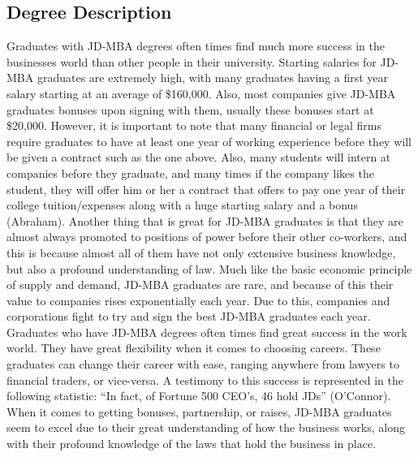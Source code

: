 \begin{multicols}{2}

\section{Degree Description}
	Graduates with JD-MBA degrees often times find much more success in the businesses world than other people in their university. Starting salaries for JD-MBA graduates are extremely high, with many graduates having a first year salary starting at an average of \$160,000. Also, most companies give JD-MBA graduates bonuses upon signing with them, usually these bonuses start at \$20,000. However, it is important to note that many financial or legal firms require graduates to have at least one year of working experience before they will be given a contract such as the one above. Also, many students will intern at companies before they graduate, and many times if the company likes the student, they will offer him or her a contract that offers to pay one year of their college tuition/expenses along with a huge starting salary and a bonus (Abraham). Another thing that is great for JD-MBA graduates is that they are almost always promoted to positions of power before their other co-workers, and this is because almost all of them have not only extensive business knowledge, but also a profound understanding of law. Much like the basic economic principle of supply and demand, JD-MBA graduates are rare, and because of this their value to companies rises exponentially each year.  Due to this, companies and corporations fight to try and sign the best JD-MBA graduates each year. Graduates who have JD-MBA degrees often times find great success in the work world. They have great flexibility when it comes to choosing careers. These graduates can change their career with ease, ranging anywhere from lawyers to financial traders, or vice-versa. A testimony to this success is represented in the following statistic: “In fact,  of Fortune 500 CEO’s, 46 hold JDs” (O’Connor). When it comes to getting bonuses, partnership, or raises, JD-MBA graduates seem to excel due to their great understanding of how the business works, along with their profound knowledge of the laws that hold the business in place.


\end{multicols}

